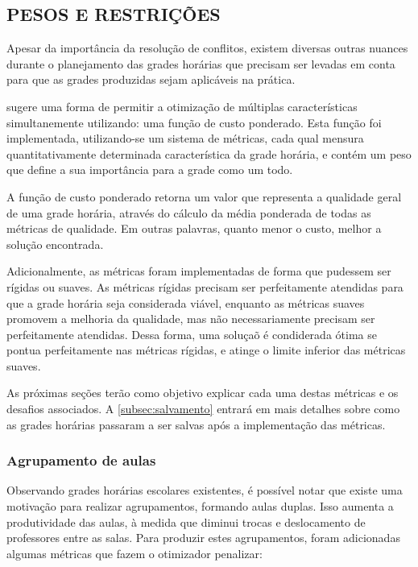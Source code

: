 \subsection{PESOS E RESTRIÇÕES}
\label{subsec:pesos_e_restricoes}

Apesar da importância da resolução de conflitos, existem diversas outras nuances durante o planejamento das grades horárias que precisam ser levadas em conta para que as grades produzidas sejam aplicáveis na prática.

 sugere uma forma de permitir a otimização de múltiplas características simultanemente utilizando: uma função de custo ponderado. Esta função foi implementada, utilizando-se um sistema de métricas, cada qual mensura quantitativamente determinada característica da grade horária, e contém um peso que define a sua importância para a grade como um todo. 

A função de custo ponderado retorna um valor que representa a qualidade geral de uma grade horária, através do cálculo da média ponderada de todas as métricas de qualidade. Em outras palavras, quanto menor o custo, melhor a solução encontrada.

Adicionalmente, as métricas foram implementadas de forma que pudessem ser rígidas ou suaves. As métricas rígidas precisam ser perfeitamente atendidas para que a grade horária seja considerada viável, enquanto as métricas suaves promovem a melhoria da qualidade, mas não necessariamente precisam ser perfeitamente atendidas. Dessa forma, uma soluçaõ é condiderada ótima se pontua perfeitamente nas métricas rígidas, e atinge o limite inferior das métricas suaves.

As próximas seções terão como objetivo explicar cada uma destas métricas e os desafios associados. A \autoref{subsec:salvamento} entrará em mais detalhes sobre como as grades horárias passaram a ser salvas após a implementação das métricas.

\subsubsection{Agrupamento de aulas}

Observando grades horárias escolares existentes, é possível notar que existe uma motivação para realizar agrupamentos, formando aulas duplas. Isso aumenta a produtividade das aulas, à medida que diminui trocas e deslocamento de professores entre as salas. Para produzir estes agrupamentos, foram adicionadas algumas métricas que fazem o otimizador penalizar:

